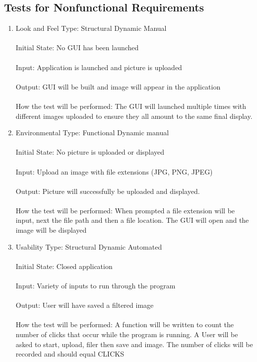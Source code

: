 \documentclass[12pt, titlepage]{article}
\begin{document}
\subsection{Tests for Nonfunctional Requirements}

\begin{enumerate}

\item{Look and Feel}
Type: Structural Dynamic Manual\\ \\
Initial State: No GUI has been launched \\ \\
Input: Application is launched and picture is uploaded\\ \\
Output: GUI will be built and image will appear in the application\\ \\
How the test will be performed: The GUI will launched multiple times with different images uploaded to ensure they all amount to the same final display.

\item{Environmental}
Type: Functional Dynamic manual\\ \\
Initial State: No picture is uploaded or displayed \\ \\
Input: Upload an image with file extensions (JPG, PNG, JPEG) \\ \\
Output: Picture will successfully be uploaded and displayed. \\ \\
How the test will be performed: When prompted a file extension will be input, next the file path and then a file location. The GUI will open and the image will be displayed

\item{Usability}
Type: Structural Dynamic Automated\\ \\
Initial State: Closed application\\ \\
Input: Variety of inputs to run through the program\\ \\
Output: User will have saved a filtered image\\ \\
How the test will be performed: A function will be written to count the number of clicks that occur while the program is running. A User will be asked to start, upload, filer then save and image. The number of clicks will be recorded and should equal CLICKS

\end{enumerate}
\end{document}
